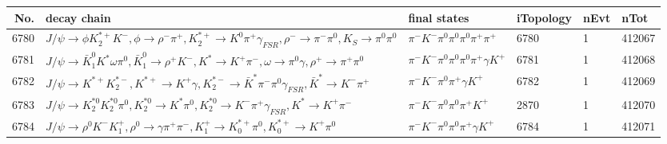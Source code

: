 \begin{table}[htbp] 
\begin{center}
\begin{small}
\begin{tabular}{rlllll}\hline\hline
 No. & decay chain & final states &  iTopology & nEvt & nTot \\\hline
6780&$J/\psi       \rightarrow \phi           K_2^{*+}       K^{-}          , \phi            \rightarrow \rho^{-}      \pi^{+}        , K_2^{*+}        \rightarrow K^{0}          \pi^{+}        \gamma_{FSR} , \rho^{-}       \rightarrow \pi^{-}        \pi^{0}        , K_{S}           \rightarrow \pi^{0}        \pi^{0}        $&$\pi^{-}        K^{-}          \pi^{0}        \pi^{0}        \pi^{0}        \pi^{+}        \pi^{+}        $& 6780&    1&412067\\
6781&$J/\psi       \rightarrow \bar{K}_1^{0} K^{*}          \omega         \pi^{0}        , \bar{K}_1^{0}  \rightarrow \rho^{+}      K^{-}          , K^{*}           \rightarrow K^{+}          \pi^{-}        , \omega          \rightarrow \pi^{0}        \gamma       , \rho^{+}       \rightarrow \pi^{+}        \pi^{0}        $&$\pi^{-}        K^{-}          \pi^{0}        \pi^{0}        \pi^{0}        \pi^{+}        \gamma       K^{+}          $& 6781&    1&412068\\
6782&$J/\psi       \rightarrow K^{*+}         K_2^{*-}       , K^{*+}          \rightarrow K^{+}          \gamma       , K_2^{*-}        \rightarrow \bar{K}^{*}   \pi^{-}        \pi^{0}        \gamma_{FSR} , \bar{K}^{*}    \rightarrow K^{-}          \pi^{+}        $&$\pi^{-}        K^{-}          \pi^{0}        \pi^{+}        \gamma       K^{+}          $& 6782&    1&412069\\
6783&$J/\psi       \rightarrow K_2^{*0}       K_2^{*0}       \pi^{0}        , K_2^{*0}        \rightarrow K^{*}          \pi^{0}        , K_2^{*0}        \rightarrow K^{-}          \pi^{+}        \gamma_{FSR} , K^{*}           \rightarrow K^{+}          \pi^{-}        $&$\pi^{-}        K^{-}          \pi^{0}        \pi^{0}        \pi^{+}        K^{+}          $& 2870&    1&412070\\
6784&$J/\psi       \rightarrow \rho^{0}      K^{-}          K_1^{+}        , \rho^{0}       \rightarrow \gamma       \pi^{+}        \pi^{-}        , K_1^{+}         \rightarrow K_{0}^{*+}     \pi^{0}        , K_{0}^{*+}      \rightarrow K^{+}          \pi^{0}        $&$\pi^{-}        K^{-}          \pi^{0}        \pi^{0}        \pi^{+}        \gamma       K^{+}          $& 6784&    1&412071\\

\end{tabular}
\end{small}
\end{center}
\end{table}
